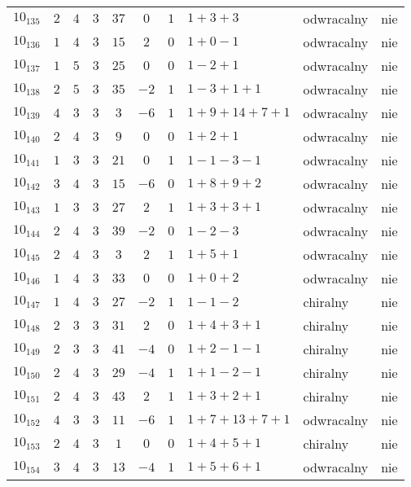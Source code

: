 \begin{longtable}{lccccccllc}
$10_{135}$ & $2$   & $4$ & $3$ & $37$  & $0$  & $1$ & $1+3+3$       & odwracalny & nie \\
$10_{136}$ & $1$   & $4$ & $3$ & $15$  & $2$  & $0$ & $1+0-1$       & odwracalny & nie \\
$10_{137}$ & $1$   & $5$ & $3$ & $25$  & $0$  & $0$ & $1-2+1$       & odwracalny & nie \\
$10_{138}$ & $2$   & $5$ & $3$ & $35$  & $-2$ & $1$ & $1-3+1+1$     & odwracalny & nie \\
$10_{139}$ & $4$   & $3$ & $3$ & $3$   & $-6$ & $1$ & $1+9+14+7+1$  & odwracalny & nie \\
$10_{140}$ & $2$   & $4$ & $3$ & $9$   & $0$  & $0$ & $1+2+1$       & odwracalny & nie \\
$10_{141}$ & $1$   & $3$ & $3$ & $21$  & $0$  & $1$ & $1-1-3-1$     & odwracalny & nie \\
$10_{142}$ & $3$   & $4$ & $3$ & $15$  & $-6$ & $0$ & $1+8+9+2$     & odwracalny & nie \\
$10_{143}$ & $1$   & $3$ & $3$ & $27$  & $2$  & $1$ & $1+3+3+1$     & odwracalny & nie \\
$10_{144}$ & $2$   & $4$ & $3$ & $39$  & $-2$ & $0$ & $1-2-3$       & odwracalny & nie \\
$10_{145}$ & $2$   & $4$ & $3$ & $3$   & $2$  & $1$ & $1+5+1$       & odwracalny & nie \\
$10_{146}$ & $1$   & $4$ & $3$ & $33$  & $0$  & $0$ & $1+0+2$       & odwracalny & nie \\
$10_{147}$ & $1$   & $4$ & $3$ & $27$  & $-2$ & $1$ & $1-1-2$       & chiralny   & nie \\
$10_{148}$ & $2$   & $3$ & $3$ & $31$  & $2$  & $0$ & $1+4+3+1$     & chiralny   & nie \\
$10_{149}$ & $2$   & $3$ & $3$ & $41$  & $-4$ & $0$ & $1+2-1-1$     & chiralny   & nie \\
$10_{150}$ & $2$   & $4$ & $3$ & $29$  & $-4$ & $1$ & $1+1-2-1$     & chiralny   & nie \\
$10_{151}$ & $2$   & $4$ & $3$ & $43$  & $2$  & $1$ & $1+3+2+1$     & chiralny   & nie \\
$10_{152}$ & $4$   & $3$ & $3$ & $11$  & $-6$ & $1$ & $1+7+13+7+1$  & odwracalny & nie \\
$10_{153}$ & $2$   & $4$ & $3$ & $1$   & $0$  & $0$ & $1+4+5+1$     & chiralny   & nie \\
$10_{154}$ & $3$   & $4$ & $3$ & $13$  & $-4$ & $1$ & $1+5+6+1$     & odwracalny & nie \\

\end{longtable}
